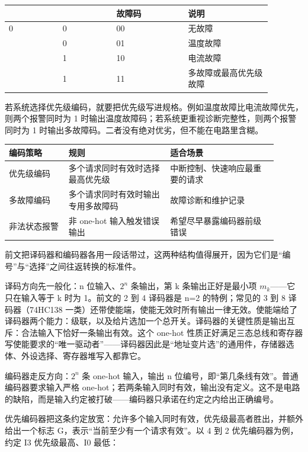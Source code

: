 \begin{longtable}{L{0.18\linewidth}L{0.18\linewidth}L{0.24\linewidth}L{0.28\linewidth}}
\toprule
{} &  & 故障码 & 说明 \\
 & 0 & 00 & 无故障 \\ & 0 & 01 & 温度故障 \\ & 1 & 10 & 电流故障 \\ & 1 & 11 & 多故障或最高优先级故障 \\
\bottomrule
\end{longtable}

若系统选择优先级编码，就要把优先级写进规格。例如温度故障比电流故障优先，则两个报警同时为 1 时输出温度故障码；若系统更重视诊断完整性，则两个报警同时为 1 时输出多故障码。二者没有绝对优劣，但不能在电路里含糊。

\begin{longtable}{L{0.2\linewidth}L{0.34\linewidth}L{0.36\linewidth}}
\toprule
编码策略 & 规则 & 适合场景 \\
\midrule
优先级编码 & 多个请求同时有效时选择最高优先级 & 中断控制、快速响应最重要的请求 \\\tablerowrule
多故障编码 & 多个请求同时有效时输出专用多故障码 & 故障诊断和维护记录 \\\tablerowrule
非法状态报警 & 非 one-hot 输入触发错误输出 & 希望尽早暴露编码器前级错误 \\
\bottomrule
\end{longtable}

前文把译码器和编码器各用一段话带过，这两种结构值得展开，因为它们是“编号”与“选择”之间往返转换的标准件。

译码方向先一般化：n 位输入、$2^n$ 条输出，第 k 条输出正好是最小项 $m_k$——它只在输入等于 k 时为 1。前文的 2 到 4 译码器是 n=2 的特例；常见的 3 到 8 译码器（74HC138 一类）还带使能端，使能无效时所有输出一律无效。使能端给了译码器两个能力：级联，以及给片选加一个总开关。译码器的关键性质是输出互斥：合法输入下恰好一条输出有效。这个 one-hot 性质正好满足三态总线和寄存器写使能要求的“唯一驱动者”——译码器因此是“地址变片选”的通用件，存储器选体、外设选择、寄存器堆写入都靠它。

编码器走反方向：$2^n$ 条 one-hot 输入，输出 n 位编号，即“第几条线有效”。普通编码器要求输入严格 one-hot；若两条输入同时有效，输出没有定义。这不是电路的缺陷，而是输入约定被打破——编码器只承诺在约定之内给出正确编号。

优先编码器把这条约定放宽：允许多个输入同时有效，优先级最高者胜出，并额外给出一个标志 G，表示“当前至少有一个请求有效”。以 4 到 2 优先编码器为例，约定 I3 优先级最高、I0 最低：

